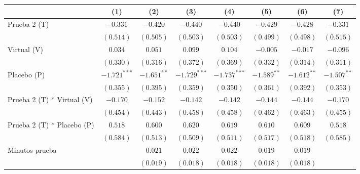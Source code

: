 
\begin{table}
\begin{center}
\begin{tabular}{l c c c c c c c}
\hline
 & (1) & (2) & (3) & (4) & (5) & (6) & (7) \\
\hline
Prueba 2 (T)                               & $-0.331$       & $-0.420$      & $-0.440$       & $-0.440$       & $-0.429$      & $-0.428$      & $-0.331$      \\
                                           & $(0.514)$      & $(0.505)$     & $(0.503)$      & $(0.503)$      & $(0.499)$     & $(0.498)$     & $(0.515)$     \\
Virtual (V)                                & $0.034$        & $0.051$       & $0.099$        & $0.104$        & $-0.005$      & $-0.017$      & $-0.096$      \\
                                           & $(0.330)$      & $(0.316)$     & $(0.372)$      & $(0.369)$      & $(0.332)$     & $(0.314)$     & $(0.311)$     \\
Placebo (P)                                & $-1.721^{***}$ & $-1.651^{**}$ & $-1.729^{***}$ & $-1.737^{***}$ & $-1.589^{**}$ & $-1.612^{**}$ & $-1.507^{**}$ \\
                                           & $(0.355)$      & $(0.395)$     & $(0.359)$      & $(0.350)$      & $(0.361)$     & $(0.392)$     & $(0.353)$     \\
Prueba 2 (T) * Virtual (V)                 & $-0.170$       & $-0.152$      & $-0.142$       & $-0.142$       & $-0.144$      & $-0.144$      & $-0.170$      \\
                                           & $(0.454)$      & $(0.443)$     & $(0.458)$      & $(0.458)$      & $(0.462)$     & $(0.463)$     & $(0.455)$     \\
Prueba 2 (T) * Placebo (P)                 & $0.518$        & $0.600$       & $0.620$        & $0.619$        & $0.610$       & $0.609$       & $0.518$       \\
                                           & $(0.584)$      & $(0.513)$     & $(0.509)$      & $(0.511)$      & $(0.517)$     & $(0.518)$     & $(0.585)$     \\
Minutos prueba                             &                & $0.021$       & $0.022$        & $0.022$        & $0.019$       & $0.019$       &               \\
                                           &                & $(0.019)$     & $(0.018)$      & $(0.018)$      & $(0.018)$     & $(0.018)$     &               \\

\end{tabular}
\end{center}
\end{table}

